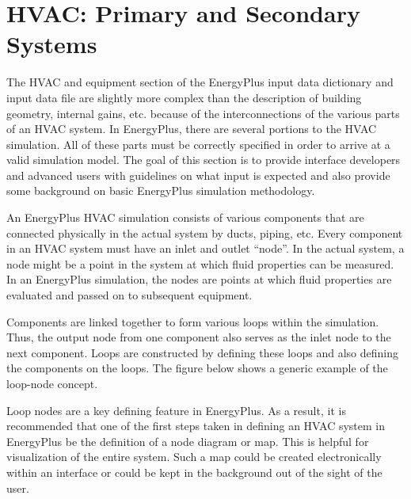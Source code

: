 \section{HVAC: Primary and Secondary Systems}\label{hvac-primary-and-secondary-systems}

The HVAC and equipment section of the EnergyPlus input data dictionary and input data file are slightly more complex than the description of building geometry, internal gains, etc. because of the interconnections of the various parts of an HVAC system. In EnergyPlus, there are several portions to the HVAC simulation. All of these parts must be correctly specified in order to arrive at a valid simulation model. The goal of this section is to provide interface developers and advanced users with guidelines on what input is expected and also provide some background on basic EnergyPlus simulation methodology.

An EnergyPlus HVAC simulation consists of various components that are connected physically in the actual system by ducts, piping, etc. Every component in an HVAC system must have an inlet and outlet ``node''. In the actual system, a node might be a point in the system at which fluid properties can be measured. In an EnergyPlus simulation, the nodes are points at which fluid properties are evaluated and passed on to subsequent equipment.

Components are linked together to form various loops within the simulation. Thus, the output node from one component also serves as the inlet node to the next component. Loops are constructed by defining these loops and also defining the components on the loops. The figure below shows a generic example of the loop-node concept.

Loop nodes are a key defining feature in EnergyPlus. As a result, it is recommended that one of the first steps taken in defining an HVAC system in EnergyPlus be the definition of a node diagram or map. This is helpful for visualization of the entire system. Such a map could be created electronically within an interface or could be kept in the background out of the sight of the user.

